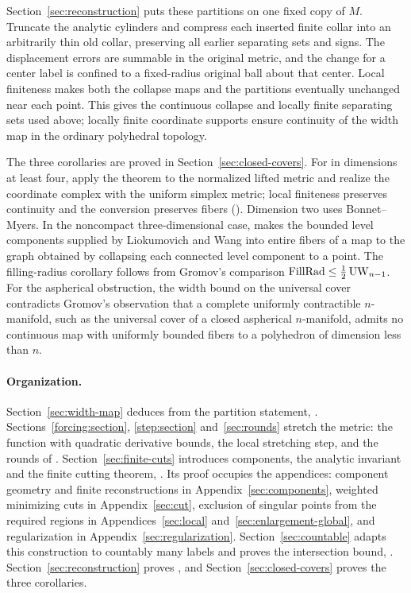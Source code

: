Section~\ref{sec:reconstruction} puts these partitions on one fixed
copy of \(M\). Truncate the analytic cylinders and compress each
inserted finite collar into an arbitrarily thin old collar, preserving
all earlier separating sets and signs. The displacement errors are summable in
the original metric, and the change for a center label is confined to
a fixed-radius original ball about that center. Local finiteness makes
both the collapse maps and the partitions eventually unchanged near
each point. This gives the continuous collapse and locally finite
separating sets used above; locally finite coordinate supports ensure continuity
of the width map in the ordinary polyhedral topology.

The three corollaries are proved in Section~\ref{sec:closed-covers}.
For  in dimensions at least four, apply the theorem
to the normalized lifted metric and realize the coordinate complex
with the uniform simplex metric; local finiteness preserves continuity
and the conversion preserves fibers (). Dimension
two uses Bonnet--Myers. In the noncompact three-dimensional case,
 makes the bounded level components supplied by
Liokumovich and Wang into entire fibers of a map to the graph obtained by collapsing each connected level component to a point.
The filling-radius corollary follows from Gromov's comparison
\(\operatorname{FillRad}\le\tfrac12\operatorname{UW}_{n-1}\).
For the aspherical obstruction, the width bound on the universal cover
contradicts Gromov's observation that a complete uniformly contractible
\(n\)-manifold, such as the universal cover of a closed aspherical
\(n\)-manifold, admits no continuous map with uniformly bounded fibers
to a polyhedron of dimension less than \(n\).

\paragraph{Organization.}
Section~\ref{sec:width-map} deduces  from the partition
statement, . Sections~\ref{forcing:section},
\ref{step:section} and~\ref{sec:rounds} stretch the metric: the
function with quadratic derivative bounds, the local stretching step, and the rounds of
. Section~\ref{sec:finite-cuts} introduces components,
the analytic invariant and the finite cutting theorem, .
Its proof occupies the appendices: component geometry and finite
reconstructions in Appendix~\ref{sec:components}, weighted minimizing cuts
in Appendix~\ref{sec:cut}, exclusion of singular points from the required regions in
Appendices~\ref{sec:local} and~\ref{sec:enlargement-global}, and
regularization in Appendix~\ref{sec:regularization}.
Section~\ref{sec:countable} adapts this construction to countably many
labels and proves the intersection bound, .
Section~\ref{sec:reconstruction} proves , and
Section~\ref{sec:closed-covers} proves the three corollaries.

